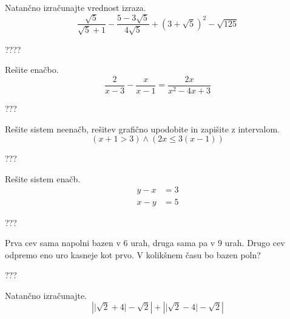 \documentclass[addpoints]{exam}
\begin{document}
\begin{questions}


    \question[6]
    Natančno izračunajte vrednost izraza.
    $$ \dfrac{\sqrt{5}}{\sqrt{5}+1}-\dfrac{5-3\sqrt{5}}{4\sqrt{5}}+\left(3+\sqrt{5}\right)^2-\sqrt{125} $$

    \begin{solution}[6cm]
        ????
    \end{solution}
    
    
    \newpage

    \question[4]
    Rešite enačbo.
    $$ \dfrac{2}{x-3}-\dfrac{x}{x-1}=\dfrac{2x}{x^2-4x+3} $$
    
    
    \begin{solution}[9cm]
        ???
    \end{solution}

        


    \question[5]
    Rešite sistem neenačb, rešitev grafično upodobite in zapišite z intervalom.
    $$ \left(x+1>3\right)\land\left(2x\leq 3(x-1)\right) $$
    
    
    \begin{solution}[8cm]
        ???
    \end{solution}


    \newpage 


    \question[4]
    Rešite sistem enačb.
    $$ \begin{aligned}
        y-x&=3 \\ x-y&=5
    \end{aligned} $$
    
    
    \begin{solution}[9cm]
        ???
    \end{solution}



    \question[4]
    Prva cev sama napolni bazen v $6$ urah, druga sama pa v $9$ urah. Drugo cev odpremo eno uro kasneje kot prvo.
    V kolikšnem času bo bazen poln?
    
    
    \begin{solution}[8cm]
        ???
    \end{solution}




    \newpage 

    
    \question[4]
    Natančno izračunajte.
    $$ \left\lvert \lvert\sqrt{2}+4\rvert-\sqrt{2}\right\rvert + \left\lvert \lvert\sqrt{2}-4\rvert-\sqrt{2}\right\rvert $$
    

\end{questions}
\end{document}
